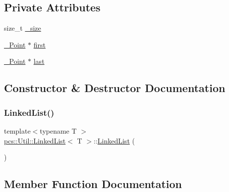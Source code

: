 \subsection*{Private Attributes}
\begin{DoxyCompactItemize}
\item 
size\+\_\+t \hyperlink{classpcs_1_1Util_1_1LinkedList_a3ce4faa5435a6f24917d9887ed8124d3}{\+\_\+size}
\item 
\hyperlink{structpcs_1_1Util_1_1LinkedList_1_1__Point}{\+\_\+\+Point} $\ast$ \hyperlink{classpcs_1_1Util_1_1LinkedList_a16b8eb9f35fc53d3a0d6c272aec4acc0}{first}
\item 
\hyperlink{structpcs_1_1Util_1_1LinkedList_1_1__Point}{\+\_\+\+Point} $\ast$ \hyperlink{classpcs_1_1Util_1_1LinkedList_a1760a747315ea22fe748f36c6016a32c}{last}
\end{DoxyCompactItemize}


\subsection{Constructor \& Destructor Documentation}
\mbox{\label{classpcs_1_1Util_1_1LinkedList_ac57e454c23a32aac315f04cd2923224a}} 
\subsubsection{\texorpdfstring{Linked\+List()}{LinkedList()}}
{\footnotesize\ttfamily template$<$typename T $>$ \\
\hyperlink{classpcs_1_1Util_1_1LinkedList}{pcs\+::\+Util\+::\+Linked\+List}$<$ T $>$\+::\hyperlink{classpcs_1_1Util_1_1LinkedList}{Linked\+List} (\begin{DoxyParamCaption}{ }\end{DoxyParamCaption})\hspace{0.3cm}{\ttfamily [inline]}}



\subsection{Member Function Documentation}
\mbox{\label{classpcs_1_1Util_1_1LinkedList_a6d9fcadd0150b4d8ff679923a6e2852f}} 
